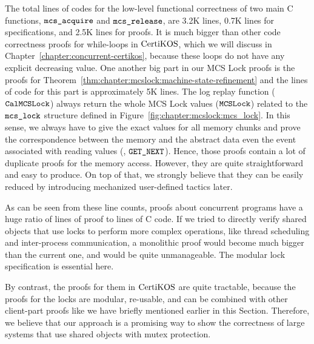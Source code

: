 The total lines of codes for the low-level functional correctness
of two main C functions, ${\mathrm{\texttt{mcs\_acquire}}}$ and ${\mathrm{\texttt{mcs\_release}}}$, are 3.2K lines,  
0.7K lines for specifications, and 2.5K lines for proofs.
It is much bigger than other code correctness proofs for while-loops in $\mathrm{CertiKOS}$, which we will
discuss in Chapter~\ref{chapter:concurrent-certikos},
because these loops do not have any explicit decreasing value.
One another big part in our MCS Lock proofs is the proofs for 
Theorem~\ref{thm:chapter:mcslock:machine-state-refinement} and the lines of code for this part is 
approximately 5K lines. The log replay function (${\mathrm{\texttt{CalMCSLock}}}$) always 
return the whole MCS Lock values (${\mathrm{\texttt{MCSLock}}}$) related 
to the  ${\mathrm{\texttt{mcs\_lock}}}$ structure defined in Figure~\ref{fig:chapter:mcslock:mcs_lock}. 
In this sense, we always have to give the exact values for all memory 
chunks and prove the correspondence between the memory and the abstract 
data even the event associated with reading values (\eg, ${\mathrm{\texttt{GET\_NEXT}}}$).
Hence, those proofs contain a lot of duplicate proofs for the memory access. 
However, they are quite straightforward and easy to produce. 
On top of that, we strongly believe 
that they can be easily reduced by introducing mechanized user-defined tactics later. 

As can be seen from these line counts, proofs about concurrent programs
have a huge ratio of lines of proof to lines of C code.
If we tried to directly verify shared objects that use locks to 
perform more complex operations, like thread scheduling
and inter-process communication, a monolithic proof  
would become much bigger than the current one, and would be quite
unmanageable. The modular lock specification is essential here.

By contrast, the proofs for them in $\mathrm{CertiKOS}$ are quite tractable, 
because the proofs for the locks are modular, re-usable, and can 
be combined with other client-part proofs like we have briefly 
mentioned earlier in this Section.
Therefore, we believe that our approach is a promising way to 
show the correctness of large systems that use shared objects with mutex protection. 

